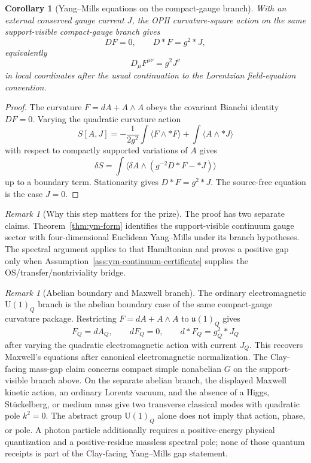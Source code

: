 \documentclass[11pt]{article}
\numberwithin{equation}{section}
\newtheorem{corollary}[theorem]{Corollary}
\theoremstyle{remark}
\newtheorem{remark}[theorem]{Remark}
\begin{document}
\begin{corollary}[Yang--Mills equations on the compact-gauge branch]
\label{cor:ym-equations}
With an external conserved gauge current \(J\), the OPH curvature-square action on the same
support-visible compact-gauge branch gives
\[
DF=0,
\qquad
D{*}F=g^2{*}J,
\]
equivalently
\[
D_\mu F^{\mu\nu}=g^2J^\nu
\]
in local coordinates after the usual continuation to the Lorentzian field-equation convention.
\end{corollary}

\begin{proof}
The curvature \(F=dA+A\wedge A\) obeys the covariant Bianchi identity \(DF=0\). Varying the
quadratic curvature action
\[
S[A,J]
=
-\frac{1}{2g^2}\int \langle F\wedge *F\rangle
+\int \langle A\wedge *J\rangle
\]
with respect to compactly supported variations of \(A\) gives
\[
\delta S
=
\int \langle \delta A\wedge (g^{-2}D{*}F-{*}J)\rangle
\]
up to a boundary term. Stationarity gives \(D{*}F=g^2{*}J\). The source-free equation is the
case \(J=0\).
\end{proof}

\begin{remark}[Why this step matters for the prize]
The proof has two separate claims. Theorem~\ref{thm:ym-form} identifies the support-visible
continuum gauge sector with four-dimensional Euclidean Yang--Mills under its branch hypotheses.
The spectral argument applies to that Hamiltonian and proves a positive gap only when
Assumption~\ref{ass:ym-continuum-certificate} supplies the OS/transfer/nontriviality bridge.
\end{remark}

\begin{remark}[Abelian boundary and Maxwell branch]
The ordinary electromagnetic \(\mathrm U(1)_Q\) branch is the abelian boundary case of the same
compact-gauge curvature package. Restricting \(F=dA+A\wedge A\) to \(\mathfrak u(1)_Q\) gives
\[
F_Q=dA_Q,
\qquad
dF_Q=0,
\qquad
d{*}F_Q=g_Q^2{*}J_Q
\]
after varying the quadratic electromagnetic action with current \(J_Q\). This recovers Maxwell's
equations after canonical electromagnetic normalization. The Clay-facing mass-gap claim concerns
compact simple nonabelian \(G\) on the support-visible branch above. On the separate abelian branch,
the displayed Maxwell kinetic action, an ordinary Lorentz vacuum, and the absence of a Higgs,
St\"uckelberg, or medium mass give two transverse classical modes with quadratic pole
\(k^2=0\). The abstract group \(\mathrm U(1)_Q\) alone does not imply that action, phase, or pole.
A photon particle additionally requires a positive-energy physical quantization and a
positive-residue massless spectral pole; none of those quantum receipts is part of the Clay-facing
Yang--Mills gap statement.
\end{remark}
\end{document}
